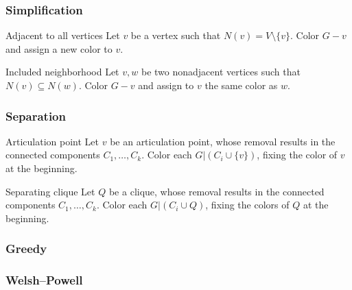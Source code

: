 \begin{frame}[fragile]
\frametitle{Simplification}

\begin{block}{Adjacent to all vertices}
Let \(v\) be a vertex such that \(N(v) = V \setminus \{v\}\).
Color \(G - v\) and assign a new color to \(v\).
\end{block}

\begin{block}{Included neighborhood}
Let \(v,w\) be two nonadjacent vertices such that \(N(v)\subseteq N(w)\).
Color \(G - v\) and assign to \(v\) the same color as \(w\).
\end{block}
\end{frame}


\begin{frame}[fragile]
\frametitle{Separation}

\begin{block}{Articulation point}
Let \(v\) be an articulation point, whose removal results in the connected
components \(C_{1}, \ldots, C_{k}\).
Color each \(G|(C_{i} \cup \{v\})\), fixing the color of \(v\) at the beginning.
\end{block}

\begin{block}{Separating clique}
Let \(Q\) be a clique, whose removal results in the connected
components \(C_{1}, \ldots, C_{k}\).
Color each \(G|(C_{i} \cup Q)\), fixing the colors of \(Q\) at the beginning.
\end{block}
\end{frame}



\begin{frame}[fragile]
\frametitle{Greedy}
\begin{algorithm}[H]
\end{algorithm}
\end{frame}

\begin{frame}[fragile]
\frametitle{Welsh--Powell}
\begin{algorithm}[H]
\end{algorithm}
\end{frame}

